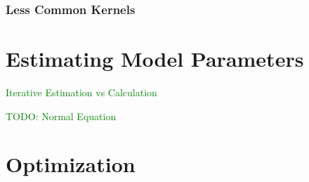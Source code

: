 \subsection{Less Common Kernels}










\chapter{Estimating Model Parameters}

\textcolor{green}{Iterative Estimation vs Calculation}

\textcolor{green}{TODO: Normal Equation}





\chapter{Optimization}



